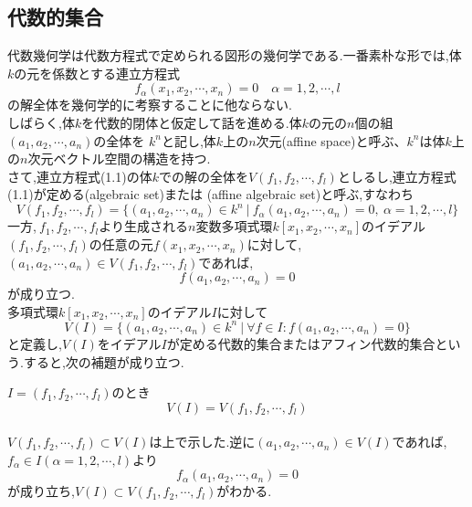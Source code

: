 \documentclass[dvipdfmx,a4paper,11pt]{jsarticle}
\begin{document}
\subsection{代数的集合}

代数幾何学は代数方程式で定められる図形の幾何学である.一番素朴な形では,体$k$の元を係数とする連立方程式
\begin{equation}
  f_{\alpha}(x_{1},x_{2},\cdots,x_{n})=0\quad \alpha = 1,2,\cdots,l
\end{equation}
の解全体を幾何学的に考察することに他ならない.\\
しばらく,体$k$を代数的閉体と仮定して話を進める.体$k$の元の$n$個の組$(a_{1},a_{2},\cdots,a_{n})$の全体を
$k^n$と記し,体$k$上の$n$次元(affine space)と呼ぶ、$k^n$は体$k$上の$n$次元ベクトル空間の構造を持つ.\\
さて,連立方程式(1.1)の体$k$での解の全体を$V(f_{1},f_{2},\cdots,f_{l})$としるし,連立方程式(1.1)が定める(algebraic set)または
(affine algebraic set)と呼ぶ,すなわち
\begin{equation*}
  V(f_{1},f_{2},\cdots,f_{l})=\{(a_{1},a_{2},\cdots,a_{n})\in k^{n}\ |\ f_{\alpha}(a_{1},a_{2},\cdots,a_{n})=0,\ \alpha = 1,2,\cdots,l\}
\end{equation*}
一方,$\ f_{1},f_{2},\cdots,f_{l}$より生成される$n$変数多項式環$k[x_{1},x_{2},\cdots,x_{n}]$のイデアル$(f_{1},f_{2},\cdots,f_{l})$の任意の元$f(x_{1},x_{2},\cdots,x_{n})$に対して,
$(a_{1},a_{2},\cdots,a_{n})\in V(f_{1},f_{2},\cdots,f_{l})$であれば,
\begin{equation*}
  f(a_{1},a_{2},\cdots,a_{n})=0
\end{equation*}
が成り立つ.\\
多項式環$k[x_{1},x_{2},\cdots,x_{n}]$のイデアル$I$に対して
\begin{equation*}
  V(I)=\{(a_{1},a_{2},\cdots,a_{n})\in k^{n}\ |\ \forall f\in I:f(a_{1},a_{2},\cdots,a_{n})=0\}
\end{equation*}
と定義し,$V(I)$をイデアル$I$が定める代数的集合またはアフィン代数的集合という.すると,次の補題が成り立つ.
\begin{tcolorbox}[title = 補題1.1,upperbox = visible]
  $I=(f_{1},f_{2},\cdots,f_{l})$のとき
  \begin{equation*}
    V(I)=V(f_{1},f_{2},\cdots,f_{l})
  \end{equation*}
  \tcblower
  \\
  $V(f_{1},f_{2},\cdots,f_{l})\subset V(I)$は上で示した.逆に$(a_{1},a_{2},\cdots,a_{n})\in V(I)$であれば,\\
  $f_{\alpha}\in I(\alpha = 1,2,\cdots,l)$より
  \begin{equation*}
    f_{\alpha}(a_{1},a_{2},\cdots,a_{n})=0
  \end{equation*}
  が成り立ち,$V(I)\subset V(f_{1},f_{2},\cdots,f_{l})$がわかる.
\end{tcolorbox}
\end{document}

